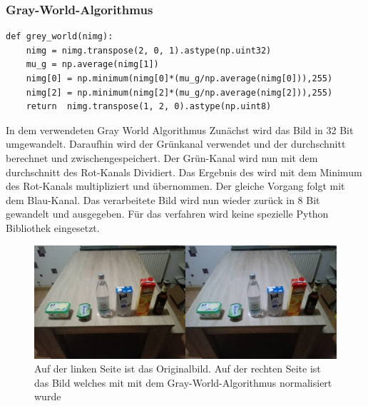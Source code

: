 \documentclass[a4paper,12pt,oneside]{article}
\begin{document}
\subsubsection{Gray-World-Algorithmus}
\begin{lstlisting}
def grey_world(nimg):
    nimg = nimg.transpose(2, 0, 1).astype(np.uint32)
    mu_g = np.average(nimg[1])
    nimg[0] = np.minimum(nimg[0]*(mu_g/np.average(nimg[0])),255)
    nimg[2] = np.minimum(nimg[2]*(mu_g/np.average(nimg[2])),255)
    return  nimg.transpose(1, 2, 0).astype(np.uint8)
\end{lstlisting}
In dem verwendeten Gray World Algorithmus \cite{gray2012world} Zunächst wird das Bild in 32 Bit umgewandelt. Daraufhin wird der Grünkanal verwendet und der durchschnitt berechnet und zwischengespeichert. Der Grün-Kanal wird nun mit dem durchschnitt des Rot-Kanals Dividiert. Das Ergebnis des wird mit dem Minimum des Rot-Kanals multipliziert und übernommen. Der gleiche Vorgang folgt mit dem Blau-Kanal. Das verarbeitete Bild wird nun wieder zurück in 8 Bit gewandelt und ausgegeben. Für das verfahren wird keine spezielle Python Bibliothek eingesetzt.
\begin{figure}
	[h]
	\centering
	\includegraphics[scale=0.3]{Sources/gwn.png}
	\caption{Auf der linken Seite ist das Originalbild. Auf der rechten Seite ist das Bild welches mit mit dem Gray-World-Algorithmus normalisiert wurde}
	\label{img:gwnimg}
\end{figure}
\end{document}
